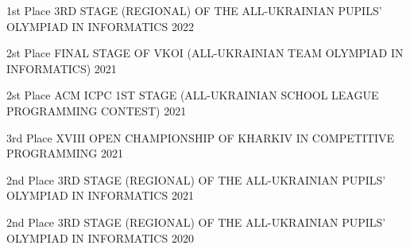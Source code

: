 







\begin{cvhonors}

  \cvhonor
    {\large 1st Place} %
    {\large 3RD STAGE (REGIONAL) OF THE ALL-UKRAINIAN PUPILS’ OLYMPIAD IN INFORMATICS} %
    { } %
    {\large 2022} %

  \cvhonor 
    {\large 2st Place} %
    {\large FINAL STAGE OF VKOI (ALL-UKRAINIAN TEAM OLYMPIAD IN INFORMATICS)} %
    { } %
    {\large 2021} %

  \cvhonor
    {\large 2st Place} %
    {\large ACM ICPC 1ST STAGE (ALL-UKRAINIAN SCHOOL LEAGUE PROGRAMMING CONTEST)} %
    { } %
    {\large 2021} %

  \cvhonor
    {\large 3rd Place} %
    {\large XVIII OPEN CHAMPIONSHIP OF KHARKIV IN COMPETITIVE PROGRAMMING} %
    { } %
    {\large 2021} %

  \cvhonor
    {\large 2nd Place} %
    {\large 3RD STAGE (REGIONAL) OF THE ALL-UKRAINIAN PUPILS’ OLYMPIAD IN INFORMATICS} %
    { } %
    {\large 2021} %

  \cvhonor
    {\large 2nd Place} %
    {\large 3RD STAGE (REGIONAL) OF THE ALL-UKRAINIAN PUPILS’ OLYMPIAD IN INFORMATICS} %
    { } %
    {\large 2020} %


\end{cvhonors}
